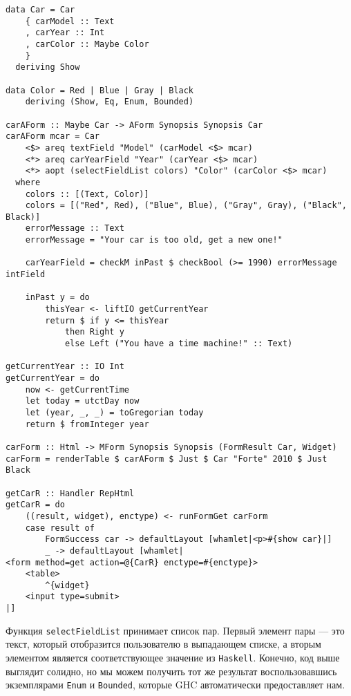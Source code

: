 \begin{lstlisting}[caption={Выпадающие списки}]
data Car = Car
    { carModel :: Text
    , carYear :: Int
    , carColor :: Maybe Color
    }
  deriving Show

data Color = Red | Blue | Gray | Black
    deriving (Show, Eq, Enum, Bounded)

carAForm :: Maybe Car -> AForm Synopsis Synopsis Car
carAForm mcar = Car
    <$> areq textField "Model" (carModel <$> mcar)
    <*> areq carYearField "Year" (carYear <$> mcar)
    <*> aopt (selectFieldList colors) "Color" (carColor <$> mcar)
  where
    colors :: [(Text, Color)]
    colors = [("Red", Red), ("Blue", Blue), ("Gray", Gray), ("Black", Black)]
    errorMessage :: Text
    errorMessage = "Your car is too old, get a new one!"

    carYearField = checkM inPast $ checkBool (>= 1990) errorMessage intField

    inPast y = do
        thisYear <- liftIO getCurrentYear
        return $ if y <= thisYear
            then Right y
            else Left ("You have a time machine!" :: Text)

getCurrentYear :: IO Int
getCurrentYear = do
    now <- getCurrentTime
    let today = utctDay now
    let (year, _, _) = toGregorian today
    return $ fromInteger year

carForm :: Html -> MForm Synopsis Synopsis (FormResult Car, Widget)
carForm = renderTable $ carAForm $ Just $ Car "Forte" 2010 $ Just Black

getCarR :: Handler RepHtml
getCarR = do
    ((result, widget), enctype) <- runFormGet carForm
    case result of
        FormSuccess car -> defaultLayout [whamlet|<p>#{show car}|]
        _ -> defaultLayout [whamlet|
<form method=get action=@{CarR} enctype=#{enctype}>
    <table>
        ^{widget}
    <input type=submit>
|]
\end{lstlisting}

Функция \lstinline'selectFieldList' принимает список пар. Первый элемент пары --- это
текст, который отобразится пользователю в выпадающем списке, а вторым элементом
является соответствующее значение из \lstinline'Haskell'. Конечно, код выше выглядит
солидно, но мы можем получить тот же результат воспользовавшись экземплярами
\lstinline'Enum' и \lstinline'Bounded', которые GHC автоматически
предоставляет нам.

